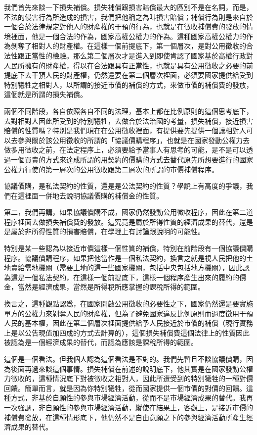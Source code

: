 \documentclass[oneside,sub3section]{ctexbook}
\begin{document}
我們首先來談一下損失補償。損失補償跟損害賠償最大的區別不是在名詞，而是，不法的侵害行為所造成的損害，我們把他稱之為叫損害賠償；補償行為則是來自於一個合於法律規定對他人的財產權的干預的行為，也就是在徵收補償費的發放的情境裡面，他是一個合法的作為，國家高權公權力的作為。這種國家高權公權力的作為剝奪了相對人的財產權。在這樣一個前提底下，第一個層次，是對公用徵收的合法性跟正當性的檢驗。那么第二個層次才是進入到即使肯認了國家基於高權行政對人民所擁有的財產權，得以在合法跟具有正當性，也就是具有公用徵收之必要的前提底下去干預人民的財產權，仍然還要在第二個層次裡面，必須要國家提供給受到特別犧牲之相對人，以所謂的接近市價的補償的方式，來做市價的補償費的發放，這個就是所謂的損失補償。

兩個不同階段，各自依照各自不同的法理，基本上都在比例原則的這個思考底下，去對相對人因此所受到的特別犧牲，去做合於法治國的考量，損失補償，接近損害賠償的性質嗎？特別是我們現在在公用徵收裡面，有提供要先提供一個讓相對人可以去參與關於該公用徵收的所謂的「協議價購程序」，也就是在國家發動公權力去做多用徵收之前，在法定程序上，必須要給予當事人有思考的可能，是不是可以透過一個買賣的方式來達成所謂的用契約的價購的方式去替代原先所想要進行的國家公權力行使的第一層次的公用徵收跟第二層次的所謂的市價補償程序。

協議價購，是私法契約的性質，還是是公法契約的性質？學說上有高度的爭議，我們在這裡面一併地去說明協議價購的補償金的性質。

第二，我們再講，如果協議價購不成，國家仍然發動公用徵收程序，因此在第二道程序裡面去做損失補償費的發放。這究竟是屬於所得性質的經濟成果的替代，還是是屬於非所得性質的損害賠償，在學理上有討論跟說明的可能性。

特別是某一些認為以接近市價這樣一個性質的補償，特別在前階段有一個協議價購程序。協議價購程序，如果把他當作是一個私法契約，換言之就是視人民把他的土地賣給需地機關（需要土地的這一些國家機關，包括中央包括地方機關），因此認為這是一個私法契約，在這樣一個前提底下，這樣一個程序產生出來的履約的價金，當然是經濟成果，當然是所得稅所應掌握的課稅所得的範圍。

換言之，這種觀點認爲，在國家開啟公用徵收的必要性之下，國家仍然還是要實施單方的公權力來剝奪人民的財產權，但為了避免國家違反比例原則而過度徵用干預人民的基本權，因此在第二個層次裡面提供給予人民接近於市價的補償（現行實務上是以公告現值加四成的方式去計算的），這個損失補償費這個法律上的性質因此被認為是一個經濟成果的替代，而認為應該是課稅所得的範圍。

這個是一個看法。但我個人認為這個看法是不對的。我們先暫且不談協議價購，因為後面再過來談這個事情。損失補償在前述的說明底下，他其實是在國家發動公權力徵收的，這種情況底下對被徵收之相對人，因此所遭受到的特別犧牲的一種對價回饋。簡單而言，就是因為你特別犧牲，從而國家提供一個市價的對價的回饋。這種方式，非基於自願性的參與市場經濟活動，從而不是市場經濟成果的替代。我再一次強調，非自願性的參與市場經濟活動，縱使在結果上，客觀上，是接近市價的補償費發放，在這種情形底下，他仍然不是自由意願之下的參與經濟活動所產生經濟成果的替代。
\end{document}
